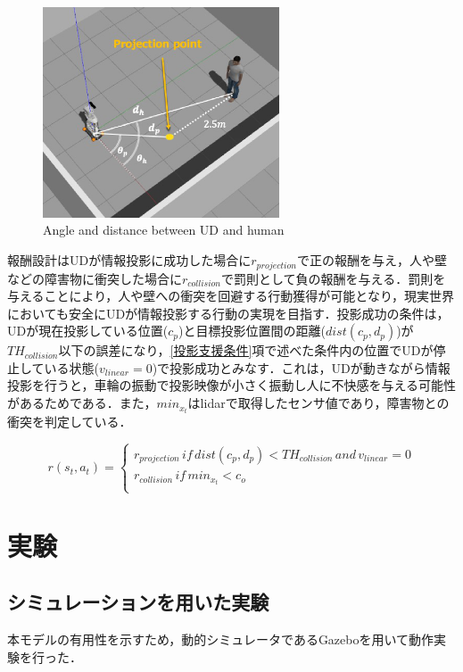 \documentclass[12pt]{sonota/aislab}
\begin{document}
\begin{figure}[t]
\begin{center}
\includegraphics[clip, width=7cm]{figs/input_human_network.eps}
\caption{Angle and distance between UD and human}
\label{input_term}
\end{center}
\end{figure}

報酬設計はUDが情報投影に成功した場合に$r_{projection}$で正の報酬を与え，人や壁などの障害物に衝突した場合に$r_{collision}$で罰則として負の報酬を与える．罰則を与えることにより，人や壁への衝突を回避する行動獲得が可能となり，現実世界においても安全にUDが情報投影する行動の実現を目指す．投影成功の条件は，UDが現在投影している位置($c_{p}$)と目標投影位置間の距離($dist(c_{p},d_{p})$)が$TH_{collision}$以下の誤差になり，\ref{投影支援条件}項で述べた条件内の位置でUDが停止している状態($v_{linear}=0$)で投影成功とみなす．これは，UDが動きながら情報投影を行うと，車輪の振動で投影映像が小さく振動し人に不快感を与える可能性があるためである．また，$min_{x_t}$はlidarで取得したセンサ値であり，障害物との衝突を判定している．

\begin{equation}
r(s_{t},a_{t})= \left \{
\begin{array}{l}
r_{projection}\,if\,dist(c_{p},d_{p})<TH_{collision}\,and\,v_{linear}=0 \\
r_{collision}\,if\,min_{x_{t}} < c_{o} \\
\end{array}
\right.
\end{equation}


\chapter{実験}
\section{シミュレーションを用いた実験}
本モデルの有用性を示すため，動的シミュレータであるGazeboを用いて動作実験を行った．
\end{document}
